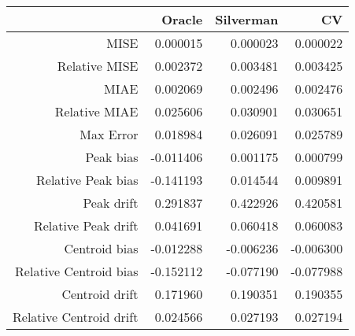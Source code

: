 \begin{tabular}{rrrr}
  \hline
 & Oracle & Silverman & CV \\ 
  \hline
MISE & 0.000015 & 0.000023 & 0.000022 \\ 
  Relative MISE & 0.002372 & 0.003481 & 0.003425 \\ 
  MIAE & 0.002069 & 0.002496 & 0.002476 \\ 
  Relative MIAE & 0.025606 & 0.030901 & 0.030651 \\ 
  Max Error & 0.018984 & 0.026091 & 0.025789 \\ 
  Peak bias & -0.011406 & 0.001175 & 0.000799 \\ 
  Relative Peak bias & -0.141193 & 0.014544 & 0.009891 \\ 
  Peak drift & 0.291837 & 0.422926 & 0.420581 \\ 
  Relative Peak drift & 0.041691 & 0.060418 & 0.060083 \\ 
  Centroid bias & -0.012288 & -0.006236 & -0.006300 \\ 
  Relative Centroid bias & -0.152112 & -0.077190 & -0.077988 \\ 
  Centroid drift & 0.171960 & 0.190351 & 0.190355 \\ 
  Relative Centroid drift & 0.024566 & 0.027193 & 0.027194 \\ 
   \hline
\end{tabular}
